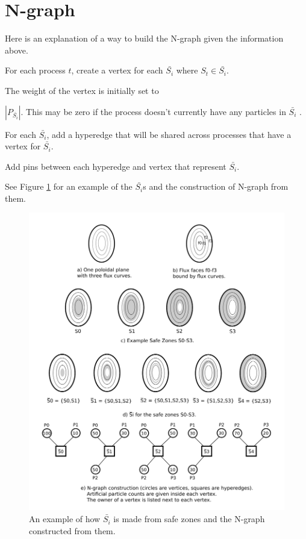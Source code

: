 \documentclass[a4paper]{article}
\begin{document}
\section{N-graph}
Here is an explanation of a way to build the N-graph given the information above.
\begin{enumerate}
  {\color{blue}
  \item For each process $t$, create a vertex for each $\bar{S_i}$ where $S_t \in \bar{S_i}$.
  }
\item The weight of the vertex is initially set to {\color{blue} $|P_{\bar{S_i}}|$. This may be zero if the process doesn't currently have any particles in $\bar{S_i}$ .
\item For each $\bar{S_i}$, add a hyperedge that will be shared across processes that have a vertex for $\bar{S_i}$.}
\item Add pins between each hyperedge and vertex that represent {\color{blue} $\bar{S_i}$.}
\end{enumerate}
See Figure \ref{fig:construct} for an example of the $\bar{S_i}$s and the construction of N-graph from them. \\


\begin{figure}[!ht]
  \centering
  \includegraphics[width=.9\textwidth]{xgcm_ngraph_construction.png}
  \caption{An example of how $\bar{S_i}$ is made from safe zones and the N-graph constructed from them.}
  \label{fig:construct}
\end{figure}
\end{document}
